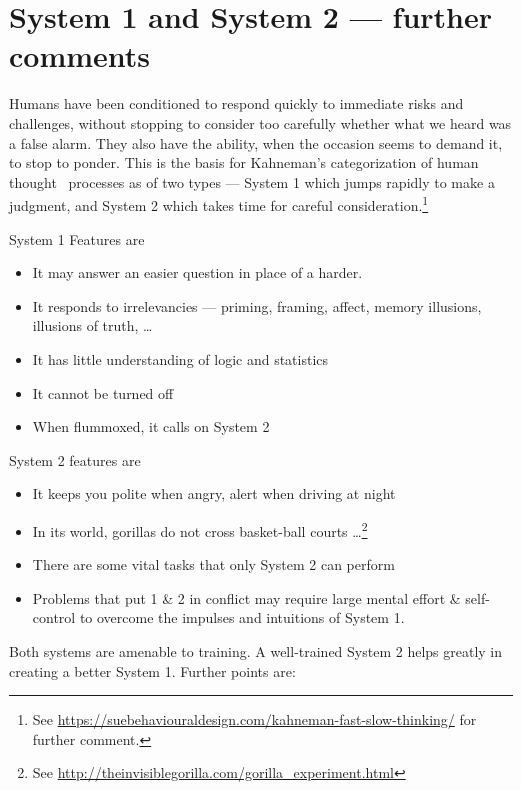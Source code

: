 \documentclass[
  10pt,
  b5paper]{book}
\providecommand{\tightlist}{%
  \setlength{\itemsep}{0pt}\setlength{\parskip}{0pt}}
\begin{document}
\hypertarget{system-1-and-system-2-further-comments}{%
\section{System 1 and System 2 --- further comments}\label{system-1-and-system-2-further-comments}}

Humans have been conditioned to respond quickly to immediate risks and challenges, without stopping to consider too carefully whether what we heard was a false alarm. They also have the ability, when the occasion seems to demand it, to stop to ponder. This is the basis for Kahneman's categorization of human thought~ processes as of two types --- System 1 which jumps rapidly to make a judgment, and System 2 which takes time for careful
consideration.\footnote{See \url{https://suebehaviouraldesign.com/kahneman-fast-slow-thinking/} for further comment.}

System 1 Features are

\begin{itemize}
\tightlist
\item
  It may answer an easier question in place of a harder.
\item
  It responds to irrelevancies --- priming, framing, affect, memory illusions, illusions of truth, \ldots{}
\item
  It has little understanding of logic and statistics
\item
  It cannot be turned off
\item
  When flummoxed, it calls on System 2
\end{itemize}

System 2 features are

\begin{itemize}
\tightlist
\item
  It keeps you polite when angry, alert when driving at night
\item
  In its world, gorillas do not cross basket-ball courts \ldots{}\footnote{See \url{http://theinvisiblegorilla.com/gorilla_experiment.html}}
\item
  There are some vital tasks that only System 2 can perform
\item
  Problems that put 1 \& 2 in conflict may require large mental effort \& self-control to overcome the impulses and intuitions of System 1.
\end{itemize}

Both systems are amenable to training. A well-trained System 2 helps
greatly in creating a better System 1. Further points are:
\end{document}
